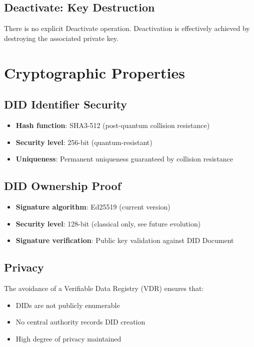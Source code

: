 \subsection{Deactivate: Key Destruction}

There is no explicit Deactivate operation. Deactivation is effectively achieved by destroying the associated private key.

\section{Cryptographic Properties}

\subsection{DID Identifier Security}

\begin{itemize}
  \item \textbf{Hash function}: SHA3-512 (post-quantum collision resistance)
  \item \textbf{Security level}: 256-bit (quantum-resistant)
  \item \textbf{Uniqueness}: Permanent uniqueness guaranteed by collision resistance
\end{itemize}

\subsection{DID Ownership Proof}

\begin{itemize}
  \item \textbf{Signature algorithm}: Ed25519 (current version)
  \item \textbf{Security level}: 128-bit (classical only, see future evolution)
  \item \textbf{Signature verification}: Public key validation against DID Document
\end{itemize}

\subsection{Privacy}

The avoidance of a Verifiable Data Registry (VDR) ensures that:
\begin{itemize}
  \item DIDs are not publicly enumerable
  \item No central authority records DID creation
  \item High degree of privacy maintained
\end{itemize}

